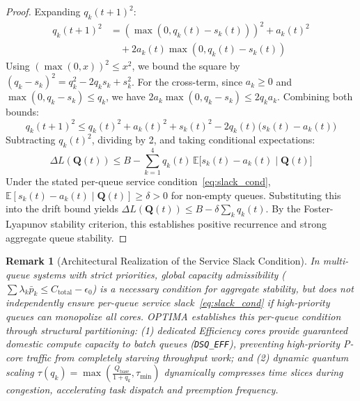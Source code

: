 \documentclass[letterpaper,twocolumn,10pt]{article}
\newtheorem{remark}{Remark}
\begin{document}
\begin{proof}
Expanding $q_k(t+1)^2$:
\begin{align}
q_k(t+1)^2 &= \left(\max(0, q_k(t) - s_k(t))\right)^2 + a_k(t)^2 \nonumber \\
&\quad + 2 a_k(t) \max(0, q_k(t) - s_k(t))
\end{align}
Using $(\max(0, x))^2 \le x^2$, we bound the square by $(q_k - s_k)^2 = q_k^2 - 2q_k s_k + s_k^2$. For the cross-term, since $a_k \ge 0$ and $\max(0, q_k - s_k) \le q_k$, we have $2 a_k \max(0, q_k - s_k) \le 2 q_k a_k$. Combining both bounds:
\begin{equation}
q_k(t+1)^2 \le q_k(t)^2 + a_k(t)^2 + s_k(t)^2 - 2 q_k(t)\big(s_k(t) - a_k(t)\big)
\end{equation}
Subtracting $q_k(t)^2$, dividing by 2, and taking conditional expectations:
\begin{equation}
\Delta L(\mathbf{Q}(t)) \le B - \sum_{k=1}^4 q_k(t) \, \mathbb{E}\big[ s_k(t) - a_k(t) \;\big|\; \mathbf{Q}(t) \big]
\end{equation}
Under the stated per-queue service condition~\eqref{eq:slack_cond}, $\mathbb{E}[s_k(t) - a_k(t) \mid \mathbf{Q}(t)] \ge \delta > 0$ for non-empty queues. Substituting this into the drift bound yields $\Delta L(\mathbf{Q}(t)) \le B - \delta \sum_k q_k(t)$. By the Foster-Lyapunov stability criterion, this establishes positive recurrence and strong aggregate queue stability.
\end{proof}

\begin{remark}[Architectural Realization of the Service Slack Condition]
In multi-queue systems with strict priorities, global capacity admissibility ($\sum \lambda_k \bar{p}_k \le C_{\mathrm{total}} - \epsilon_0$) is a necessary condition for aggregate stability, but does not independently ensure per-queue service slack~\eqref{eq:slack_cond} if high-priority queues can monopolize all cores. OPTIMA establishes this per-queue condition through structural partitioning:
(1) dedicated Efficiency cores provide guaranteed domestic compute capacity to batch queues (\texttt{DSQ\_EFF}), preventing high-priority P-core traffic from completely starving throughput work; and
(2) dynamic quantum scaling $\tau(q_k) = \max(\frac{Q_{\mathrm{base}}}{1+q_k}, \tau_{\min})$ dynamically compresses time slices during congestion, accelerating task dispatch and preemption frequency.
\end{remark}
\end{document}
